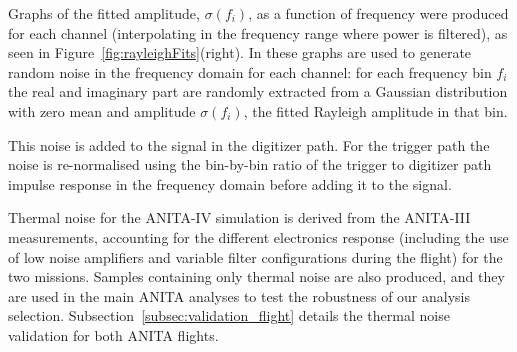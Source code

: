 Graphs of the fitted amplitude, $\sigma(f_i)$, as a function of
frequency were produced for each channel (interpolating in the frequency range where power is filtered), as seen in Figure~\ref{fig:rayleighFits}(right).
In \icemc these graphs are used to generate random noise in the
frequency domain for each channel: for each frequency bin $f_i$ the real and imaginary part are randomly extracted from a Gaussian distribution with zero mean and amplitude
$\sigma(f_i)$, the fitted Rayleigh amplitude in that bin.

This noise is added to the signal in the digitizer path.
For the trigger path the noise is re-normalised using the bin-by-bin ratio of the
trigger to digitizer path impulse response in the frequency domain
before adding it to the signal.

Thermal noise for the ANITA-IV simulation is derived from the ANITA-III measurements, accounting for the different electronics response (including the use of low noise amplifiers and variable filter configurations during the flight) for the two missions.
Samples containing only thermal noise are also produced, and they are used in
the main ANITA analyses to test the robustness of our analysis selection.
Subsection~\ref{subsec:validation_flight} details the thermal noise validation for both ANITA flights.


